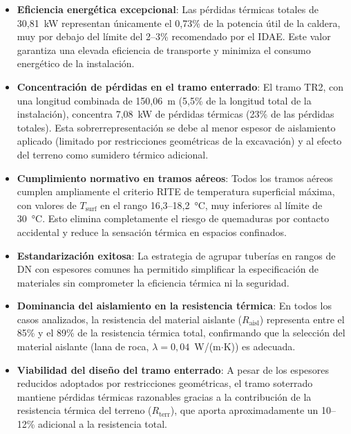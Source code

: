 \documentclass[12pt]{article}
\begin{document}
\begin{itemize}[noitemsep]
	\item \textbf{Eficiencia energética excepcional}: Las pérdidas térmicas totales de 30{,}81~kW representan únicamente el 0{,}73\% de la potencia útil de la caldera, muy por debajo del límite del 2--3\% recomendado por el IDAE. Este valor garantiza una elevada eficiencia de transporte y minimiza el consumo energético de la instalación.

	\item \textbf{Concentración de pérdidas en el tramo enterrado}: El tramo TR2, con una longitud combinada de 150{,}06~m (5{,}5\% de la longitud total de la instalación), concentra 7{,}08~kW de pérdidas térmicas (23\% de las pérdidas totales). Esta sobrerrepresentación se debe al menor espesor de aislamiento aplicado (limitado por restricciones geométricas de la excavación) y al efecto del terreno como sumidero térmico adicional.

	\item \textbf{Cumplimiento normativo en tramos aéreos}: Todos los tramos aéreos cumplen ampliamente el criterio RITE de temperatura superficial máxima, con valores de $T_{\text{surf}}$ en el rango 16{,}3--18{,}2~°C, muy inferiores al límite de 30~°C. Esto elimina completamente el riesgo de quemaduras por contacto accidental y reduce la sensación térmica en espacios confinados.

	\item \textbf{Estandarización exitosa}: La estrategia de agrupar tuberías en rangos de DN con espesores comunes ha permitido simplificar la especificación de materiales sin comprometer la eficiencia térmica ni la seguridad.

	\item \textbf{Dominancia del aislamiento en la resistencia térmica}: En todos los casos analizados, la resistencia del material aislante ($R_{\text{aisl}}$) representa entre el 85\% y el 89\% de la resistencia térmica total, confirmando que la selección del material aislante (lana de roca, $\lambda = 0{,}04$~W/(m$\cdot$K)) es adecuada.

	\item \textbf{Viabilidad del diseño del tramo enterrado}: A pesar de los espesores reducidos adoptados por restricciones geométricas, el tramo soterrado mantiene pérdidas térmicas razonables gracias a la contribución de la resistencia térmica del terreno ($R_{\text{terr}}$), que aporta aproximadamente un 10--12\% adicional a la resistencia total.
\end{itemize}
\end{document}
